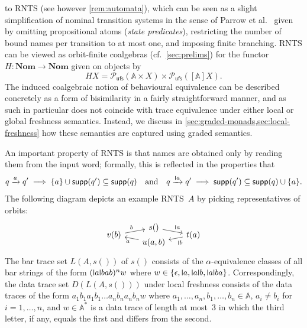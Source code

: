 \documentclass[11pt,a4paper]{amsart}
\newcommand{\Names}{\mathbb{A}}
\newcommand{\powufs}{\pow_{\mathsf{ufs}}}
\newcommand{\pow}{\mathcal{P}}
\newcommand{\supp}{\mathsf{supp}}
\theoremstyle{plain}
\newcommand{\midmid}{\hspace{0.2ex}{\rule[-0.1ex]{0.6pt}{1.65ex}}\hspace{0.2ex}}
\newcommand{\scriptmidmid}{\hspace{0.2ex}{\rule[-0.1ex]{0.6pt}{1.1ex}}\hspace{0.2ex}}
\newcommand{\newletter}[1]{{\midmid}#1}
\newcommand{\scriptnew}[1]{{\scriptmidmid}#1}
\numberwithin{equation}{section}
\newcommand{\+}[1]{\mathcal{#1}\xspace}
\newcommand{\Nom}{\mathbf{Nom}}
\theoremstyle{definition}
\begin{document}
to RNTS (see however \cref{rem:automata}), which can be seen as a
slight simplification of nominal transition systems in the sense of
Parrow et al.~\cite{ParrowEA21} given by omitting propositional atoms
(\emph{state predicates}), restricting the number of bound names per
transition to at most one, and imposing finite
branching. %
RNTS can be viewed as orbit-finite coalgebras (cf.~\cref{sec:prelims})
for the functor \(H\colon \Nom \to \Nom\) given on objects by
\begin{equation}\label{eq:rnna-functor}
  HX = \powufs(\Names \times X) \times \powufs([\Names]X).
\end{equation}
The induced coalgebraic notion of behavioural equivalence can be
described concretely as a form of bisimilarity in a fairly
straightforward manner, and as such in particular does not coincide
with trace equivalence under either local or global freshness
semantics. Instead, we discuss in
\cref{sec:graded-monads,sec:local-freshness} how these semantics are
captured using graded semantics.

An important property of RNTS is that names are
obtained only by reading them from the input word; formally, this is
reflected in the properties that
\begin{equation*}
  q\xrightarrow{a}q' \implies \{a\} \cup\supp(q')\subseteq\supp(q)
  \quad\text{and}\quad
  q\xrightarrow{\scriptnew a}q' \implies \supp(q')\subseteq\supp(q)\cup\{a\}.
\end{equation*}
The following diagram depicts an example RNTS~$A$ by picking
representatives of orbits:
\begin{equation*}
  \begin{tikzcd}[row sep=-3.0mm, column sep=6mm,baseline=-1mm]
    & s()\arrow[dr,"\scriptnew a"]\\
    v(b) \arrow[ur,"b"]& & t(a)\arrow[dl,"\scriptnew b"]\\
    & u(a,b)\arrow[ul,"a"]
  \end{tikzcd}
\end{equation*}
The bar trace set $L(A,s())$ of $s()$ consists of the
$\alpha$-equivalence classes of all bar strings of the form
$(\newletter a\newletter bab)^nw$ where
$w\in\{\epsilon,\newletter a,\newletter a \newletter b,\newletter a
\newletter ba\}$. Correspondingly, the data trace set $D(L(A,s()))$
under local freshness consists of the data traces of the form
$a_1b_1a_1b_1\dots a_nb_na_nb_nw$ where
$a_1,\dots,a_n,b_1,\dots,b_n\in\Names$, $a_i\neq b_i$ for
$i=1,\dots,n$, and $w\in\Names^*$ is a data trace of length at
most~$3$ in which the third letter, if any, equals the first and
differs from the second.
\end{document}
